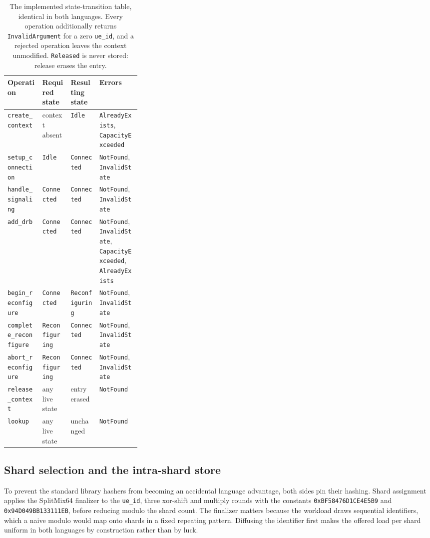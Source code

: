 \documentclass[english,twoside,openright,a4paper,censored,csm,software-track-2020]{HYthesisML}
\begin{document}
\begin{table}
\centering
\small
\caption[The implemented state-transition table]{The implemented state-transition table, identical in both languages. Every operation
additionally returns \texttt{InvalidArgument} for a zero \texttt{ue\_id}, and a rejected
operation leaves the context unmodified. \texttt{Released} is never stored: release erases
the entry.\label{tab:transitions}}
\begin{tabular}{@{}l l l R{0.31\linewidth}@{}}
\hline\hline
Operation & Required state & Resulting state & Errors \\
\hline
\texttt{create\_context}       & context absent   & \texttt{Idle}          & \texttt{AlreadyExists}, \texttt{CapacityExceeded} \\
\texttt{setup\_connection}     & \texttt{Idle}          & \texttt{Connected}     & \texttt{NotFound}, \texttt{InvalidState} \\
\texttt{handle\_signaling}     & \texttt{Connected}     & \texttt{Connected}     & \texttt{NotFound}, \texttt{InvalidState} \\
\texttt{add\_drb}              & \texttt{Connected}     & \texttt{Connected}     & \texttt{NotFound}, \texttt{InvalidState}, \texttt{CapacityExceeded}, \texttt{AlreadyExists} \\
\texttt{begin\_reconfigure}    & \texttt{Connected}     & \texttt{Reconfiguring} & \texttt{NotFound}, \texttt{InvalidState} \\
\texttt{complete\_reconfigure} & \texttt{Reconfiguring} & \texttt{Connected}     & \texttt{NotFound}, \texttt{InvalidState} \\
\texttt{abort\_reconfigure}    & \texttt{Reconfiguring} & \texttt{Connected}     & \texttt{NotFound}, \texttt{InvalidState} \\
\texttt{release\_context}      & any live state   & entry erased           & \texttt{NotFound} \\
\texttt{lookup}                & any live state   & unchanged              & \texttt{NotFound} \\
\hline
\end{tabular}
\end{table}

\subsection{Shard selection and the intra-shard store}
To prevent the standard library hashers from becoming an accidental language advantage, both
sides pin their hashing. Shard assignment applies the SplitMix64 finalizer to the
\texttt{ue\_id}, three xor-shift and multiply rounds with the constants
\texttt{0xBF58476D1CE4E5B9} and \texttt{0x94D049BB133111EB}, before reducing modulo the shard
count. The finalizer matters because the workload draws sequential identifiers, which a naive
modulo would map onto shards in a fixed repeating pattern. Diffusing the identifier first makes
the offered load per shard uniform in both languages by construction rather than by luck.
\end{document}
